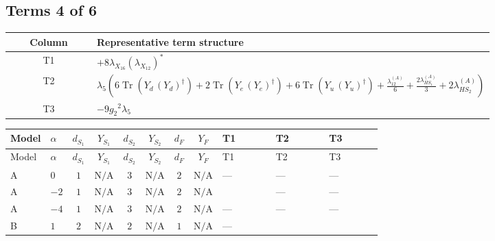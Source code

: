 \documentclass[8pt]{article}
\begin{document}
\begin{landscape}
\subsection*{Terms 4 of 6}
\begin{center}
\begin{tabular}{@{}c >{\raggedright\arraybackslash}p{0.82\linewidth}@{}}
\toprule
Column & Representative term structure \\
\midrule
T1 & \(\displaystyle +8 {\lambda_{X_{16}}} \left({\lambda_{X_{12}}}\right)^{*}\) \\
\midrule
T2 & \(\displaystyle {\lambda_5} \left(6 \operatorname{Tr}\!\left({Y_d}\,\left({Y_d}\right)^{\dagger}\right)+2 \operatorname{Tr}\!\left({Y_e}\,\left({Y_e}\right)^{\dagger}\right)+6 \operatorname{Tr}\!\left({Y_u}\,\left({Y_u}\right)^{\dagger}\right)+\frac{{\lambda_{12}^{(A)}}}{6}+\frac{2 {\lambda_{HS_1}^{(A)}}}{3}+2 {\lambda_{HS_2}^{(A)}}\right)\) \\
\midrule
T3 & \(\displaystyle -9 {g_2}^2 {\lambda_5}\) \\
\midrule
\bottomrule
\end{tabular}
\end{center}
\smallskip
\tiny
\begin{longtable}{@{}llcccccc >{\raggedright\arraybackslash}p{0.21\linewidth} >{\raggedright\arraybackslash}p{0.21\linewidth} >{\raggedright\arraybackslash}p{0.21\linewidth}@{}}
\toprule
Model & $\alpha$ & $d_{S_1}$ & $Y_{S_1}$ & $d_{S_2}$ & $Y_{S_2}$ & $d_F$ & $Y_F$ & T1 & T2 & T3 \\
\midrule
\endfirsthead
\toprule
Model & $\alpha$ & $d_{S_1}$ & $Y_{S_1}$ & $d_{S_2}$ & $Y_{S_2}$ & $d_F$ & $Y_F$ & T1 & T2 & T3 \\
\midrule
\endhead
A & $0$ & $1$ & $\text{N/A}$ & $3$ & $\text{N/A}$ & $2$ & $\text{N/A}$ & --- & --- & --- \\
\midrule
A & $-2$ & $1$ & $\text{N/A}$ & $3$ & $\text{N/A}$ & $2$ & $\text{N/A}$ & \scriptsize\adjustbox{max width=\linewidth}{$\begin{gathered} +8 {\lambda_{X_{16}}} \left({\lambda_{X_{12}}}\right)^{*}\end{gathered}$} & --- & --- \\
\midrule
A & $-4$ & $1$ & $\text{N/A}$ & $3$ & $\text{N/A}$ & $2$ & $\text{N/A}$ & --- & --- & --- \\
\midrule
B & $1$ & $2$ & $\text{N/A}$ & $2$ & $\text{N/A}$ & $1$ & $\text{N/A}$ & --- & \scriptsize\adjustbox{max width=\linewidth}{$\begin{gathered} {\lambda_5} \left(6 \operatorname{Tr}\!\left({Y_d}\,\left({Y_d}\right)^{\dagger}\right)+2 \operatorname{Tr}\!\left({Y_e}\,\left({Y_e}\right)^{\dagger}\right)+6 \operatorname{Tr}\!\left({Y_u}\,\left({Y_u}\right)^{\dagger}\right)+\frac{{\lambda_{12}^{(A)}}}{6}+\frac{2 {\lambda_{HS_1}^{(A)}}}{3}+2 {\lambda_{HS_2}^{(A)}}\right)\end{gathered}$} & \scriptsize\adjustbox{max width=\linewidth}{$\begin{gathered} -9 {g_2}^2 {\lambda_5}\end{gathered}$} \\

\end{longtable}
\end{landscape}
\end{document}
